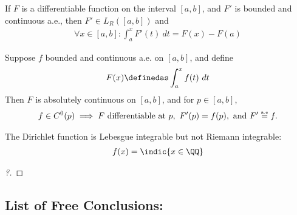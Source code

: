\begin{theorem}

If \(F\) is a differentiable function on the interval \([a,b]\), and
\(F'\) is bounded and continuous a.e., then \(F' \in L_R([a, b])\) and
\begin{align*}
\forall x\in [a,b]: \int_a^x F'(t)~dt=F(x)-F(a)
\end{align*}

Suppose \(f\) bounded and continuous a.e. on \([a,b]\), and define
\begin{align*}
F(x) \definedas \int_a^x f(t)~dt
\end{align*} Then \(F\) is absolutely continuous on \([a,b]\), and for
\(p \in [a,b]\),
\begin{align*}
f \in C^0(p) \implies F \text{ differentiable at } p,~ F'(p) = f(p), \text{ and } F' \stackrel{\tiny\mbox{a.e}}{=} f.
\end{align*}

\end{theorem}

\begin{proposition}

The Dirichlet function is Lebesgue integrable but not Riemann
integrable:
\begin{align*}
f(x) = \indic{x \in \QQ}
\end{align*}

\end{proposition}

\begin{proof}[?]


\end{proof}

\hypertarget{list-of-free-conclusions}{%
\subsection{List of Free Conclusions:}\label{list-of-free-conclusions}}

